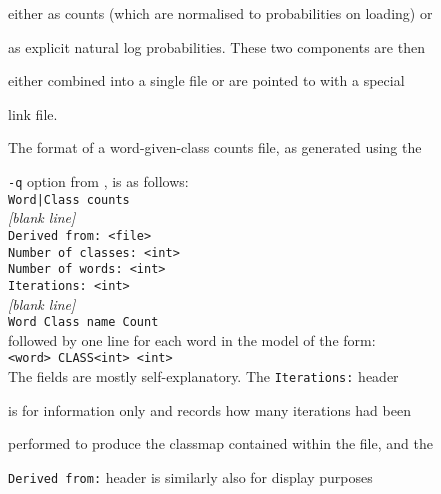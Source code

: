 either as counts (which are normalised to probabilities on loading) or


as explicit natural log probabilities.  These two components are then


either combined into a single file or are pointed to with a special


link file.












The format of a word-given-class counts file, as generated using the


\texttt{-q} option from , is as follows:\\


\texttt{Word|Class counts}\\


\textit{[blank line]}\\


\texttt{Derived from: <file>}\\


\texttt{Number of classes: <int>}\\


\texttt{Number of words: <int>}\\


\texttt{Iterations: <int>}\\


\textit{[blank line]}\\


\texttt{Word    Class name   Count}\\


followed by one line for each word in the model of the form:\\


\texttt{<word> CLASS<int> <int>}\\





The fields are mostly self-explanatory.  The {\tt Iterations:} header


is for information only and records how many iterations had been


performed to produce the classmap contained within the file, and the


{\tt Derived from:} header is similarly also for display purposes


